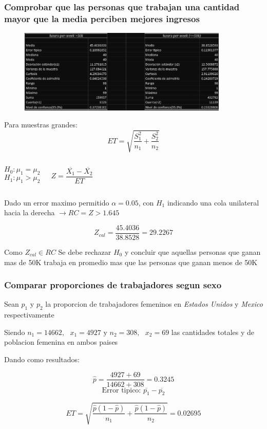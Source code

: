 \documentclass{beamer}
\begin{document}
\begin{frame}
  \frametitle{Comprobar que las personas que trabajan una cantidad
  mayor que la media perciben mejores ingresos
  }
  \begin{figure}[t]
      \includegraphics[width=10cm]{alvares1.png}
  \end{figure}
\end{frame}

\begin{frame}
  Para muestras grandes: \[ET = \sqrt{\frac{S_1 ^ 2}{n_1} + \frac{S_2 ^ 2}{n_2}}\]

  \begin{columns}
   \[H_0: \mu_1 = \mu_2\]
   \[H_1: \mu_1 > \mu_2\]


      \[\textit{Z} = \frac{\overline{X_1} - \overline{X_2}}{ET}\]
      \newline

  \end{columns}

  Dado un error maximo permitido $\alpha = 0.05$, con \textit{$H_1$} indicando una cola unilateral
  hacia la derecha $\rightarrow RC = {Z > 1.645}$

  \[Z_{cal} = \frac{45.4036}{38.8528} = 29.2267\]

  Como \textit{$Z_{cal} \in RC$} Se debe rechazar \textit{$H_0$} y concluir que
  aquellas personas que ganan mas de 50K trabaja en promedio mas que las personas
  que ganan menos de 50K

\end{frame}

\begin{frame}
  \frametitle{Comparar proporciones de trabajadores segun sexo}
  Sean $p_1 \textrm{ y } p_2$ la proporcion de trabajadores femeninos en \textit{Estados Unidos}
  y \textit{Mexico} respectivamente

  Siendo $n_1 = 14662,\textrm{ } x_1 = 4927 \textrm{ y } n_2 = 308, \textrm{ } x_2 = 69$ las cantidades totales
  y de poblacion femenina en ambos paises

  Dando como resultados:

  \[
    \hat{p} = \frac{4927 + 69}{14662 + 308} = 0.3245 \]
  \[
    \textrm{Error tipico: } \overline{p_1} - \overline{p_2}
  \]

  \[
    ET = \sqrt{\frac{\hat{p}(1 - \hat{p})}{n_1} + \frac{\hat{p}(1 - \hat{p})}{n_2}} = 0.02695
  \]

\end{frame}
\end{document}
